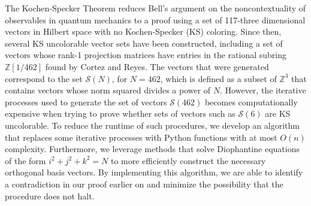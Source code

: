 \documentclass[11pt]{article}
\begin{document}
\pagestyle{fancy}

\lfoot{} 
\rfoot{}
	The Kochen-Specker Theorem reduces Bell’s argument on the noncontextuality of observables in quantum mechanics to a proof using a set of 117-three dimensional vectors in Hilbert space with no Kochen-Specker (KS) coloring. Since then, several KS uncolorable vector sets have been constructed, including a set of vectors whose rank-1 projection matrices have entries in the rational subring $\mathbb{Z}[1/462]$ found by Cortez and Reyes. The vectors that were generated correspond to the set $\mathcal{S}(N)$, for $N = 462$, which is defined as a subset of $\mathbb{Z}^{3}$ that contains vectors whose norm squared divides a power of $N$. However, the iterative processes used to generate the set of vectors $\mathcal{S}(462)$ becomes computationally expensive when trying to prove whether sets of vectors such as $\mathcal{S}(6)$ are KS uncolorable. To reduce the runtime of such procedures, we develop an algorithm that replaces some iterative processes with Python functions with at most $O(n)$ complexity. Furthermore, we leverage methods that solve Diophantine equations of the form $i^{2} + j^{2} + k^{2} = N$ to more efficiently construct the necessary orthogonal basis vectors. By implementing this algorithm, we are able to identify a contradiction in our proof earlier on and minimize the possibility that the procedure does not halt.
\end{document}
